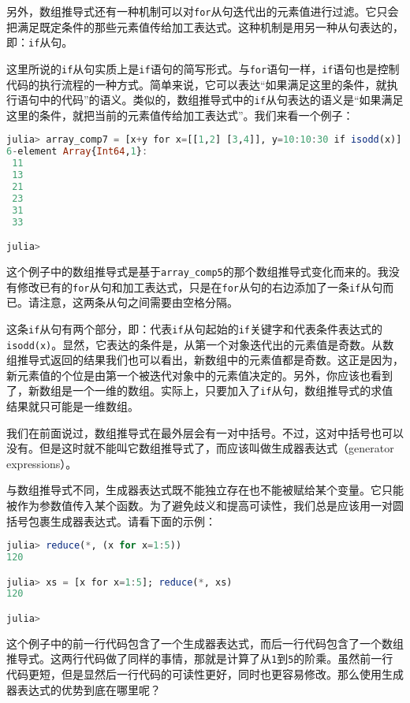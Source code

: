 另外，数组推导式还有一种机制可以对\verb`for`从句迭代出的元素值进行过滤。它只会把满足既定条件的那些元素值传给加工表达式。这种机制是用另一种从句表达的，即：\verb`if`从句。

这里所说的\verb`if`从句实质上是\verb`if`语句的简写形式。与\verb`for`语句一样，\verb`if`语句也是控制代码的执行流程的一种方式。简单来说，它可以表达“如果满足这里的条件，就执行语句中的代码”的语义。类似的，数组推导式中的\verb`if`从句表达的语义是“如果满足这里的条件，就把当前的元素值传给加工表达式”。我们来看一个例子：

\begin{lstlisting}[language=julia]
julia> array_comp7 = [x+y for x=[[1,2] [3,4]], y=10:10:30 if isodd(x)]
6-element Array{Int64,1}:
 11
 13
 21
 23
 31
 33

julia>
\end{lstlisting}

这个例子中的数组推导式是基于\verb`array_comp5`的那个数组推导式变化而来的。我没有修改已有的\verb`for`从句和加工表达式，只是在\verb`for`从句的右边添加了一条\verb`if`从句而已。请注意，这两条从句之间需要由空格分隔。

这条\verb`if`从句有两个部分，即：代表\verb`if`从句起始的\verb`if`关键字和代表条件表达式的\verb`isodd(x)`。显然，它表达的条件是，从第一个对象迭代出的元素值是奇数。从数组推导式返回的结果我们也可以看出，新数组中的元素值都是奇数。这正是因为，新元素值的个位是由第一个被迭代对象中的元素值决定的。另外，你应该也看到了，新数组是一个一维的数组。实际上，只要加入了\verb`if`从句，数组推导式的求值结果就只可能是一维数组。

我们在前面说过，数组推导式在最外层会有一对中括号。不过，这对中括号也可以没有。但是这时就不能叫它数组推导式了，而应该叫做生成器表达式（generator expressions）。

与数组推导式不同，生成器表达式既不能独立存在也不能被赋给某个变量。它只能被作为参数值传入某个函数。为了避免歧义和提高可读性，我们总是应该用一对圆括号包裹生成器表达式。请看下面的示例：

\begin{lstlisting}[language=julia]
julia> reduce(*, (x for x=1:5))
120

julia> xs = [x for x=1:5]; reduce(*, xs)
120

julia> 
\end{lstlisting}

这个例子中的前一行代码包含了一个生成器表达式，而后一行代码包含了一个数组推导式。这两行代码做了同样的事情，那就是计算了从\verb`1`到\verb`5`的阶乘。虽然前一行代码更短，但是显然后一行代码的可读性更好，同时也更容易修改。那么使用生成器表达式的优势到底在哪里呢？

